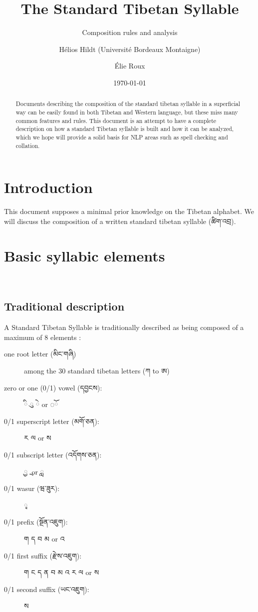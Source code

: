 \documentclass[%
a4paper,%
pagesize,%
12pt,%
parskip=off,%
bibliography=totoc,%
numbers=noenddot,%
DIV=12,%
twoside=semi,%
headings=normal%
]{scrartcl}
\title{The Standard Tibetan Syllable}
\subtitle{Composition rules and analysis}
\author{Hélios Hildt (Université Bordeaux Montaigne) \and Élie Roux}
\date{\today}
\begin{document}
\maketitle

\begin{abstract}
Documents describing the composition of the standard tibetan syllable in a superficial way can be easily found in both Tibetan and Western language, but these miss many common features and rules. This document is an attempt to have a complete description on how a standard Tibetan syllable is built and how it can be analyzed, which we hope will provide a solid basis for NLP areas such as spell checking and collation.
\end{abstract}


\tableofcontents

\newpage

\section*{Introduction}

This document supposes a minimal prior knowledge on the Tibetan alphabet. We will discuss the composition of a written standard tibetan syllable (ཚིག་འབྲ).

\section{Basic syllabic elements}

­\subsection{Traditional description}

A Standard Tibetan Syllable is traditionally described as being composed of a maximum of 8 elements :

\begin{description}
  \item[one root letter (མིང་གཞི)] among the 30 standard tibetan letters (ཀ to ཨ)
  \item[zero or one (0/1) vowel (དབྱངས):] {\tibetanfont ◌}ི {\tibetanfont ◌\kern 0.5mm}ུ {\tibetanfont ◌}ེ or {\tibetanfont ◌}ོ
  \item[0/1 superscript letter (མགོ་ཅན):] ར ལ or ས
  \item[0/1 subscript letter (འདོགས་ཅན):] ྱ ྲ or ླ
  \item[0/1 wasur (ཝ་ཟུར):] ྭ
  \item[0/1 prefix (སྔོན་འཇུག):] ག ད བ མ or འ
  \item[0/1 first suffix (རྫེས་འཇུག):] ག ང ད ན བ མ འ ར ལ or ས
  \item[0/1 second suffix (ཡང་འཇུག):] ས
\end{description}
\end{document}
